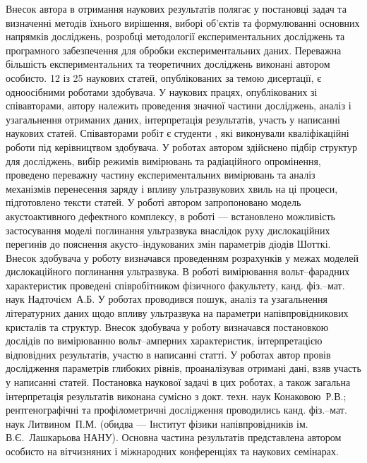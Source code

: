 {\contributionTXT}
Внесок автора в отримання наукових результатів полягає у постановці задач
та визначенні методів їхнього вирішення, виборі об'єктів та формулюванні
основних напрямків досліджень,
розробці методології експериментальних досліджень та програмного забезпечення для обробки експериментальних даних.
Переважна більшість експериментальних та теоретичних досліджень виконані автором особисто.
12 із 25 наукових статей, опублікованих за темою дисертації, є одноосібними роботами здобувача.
У наукових працях, опублікованих зі співавторами, автору належить проведення значної частини досліджень, аналіз і узагальнення отриманих
даних, інтерпретація результатів, участь у написанні наукових статей.
Співавторами робіт \cite{Olikh2018JAP,Olikh:Ultras2016,Olikh2016JSem,OlikhJAP,Olikh:PZTF2006} є студенти \thesisOfOrganization,
які виконували кваліфікаційні роботи під керівництвом здобувача.
У роботах \cite{Olikh2018JAP,Olikh:Ultras2016,Olikh2016JSem,OlikhJAP,Olikh:SEMT2007,Olikh:MRS2007a,Olikh:PZTF2006} автором здійснено підбір структур для досліджень, вибір режимів вимірювань та радіаційного опромінення,
проведено переважну частину експериментальних вимірювань та аналіз механізмів перенесення заряду і впливу ультразвукових хвиль на ці процеси,
підготовлено тексти статей.
У роботі \cite{Olikh2018JAP} автором запропоновано модель акустоактивного дефектного комплексу,
в роботі \cite{Olikh:Ultras2016} --- встановлено можливість застосування моделі поглинання ультразвука внаслідок руху дислокаційних перегинів до пояснення акусто--індукованих змін параметрів діодів Шотткі.
Внесок здобувача у роботу \cite{Olikh:UPJ2014} визначався проведенням розрахунків у межах моделей дислокаційного поглинання ультразвука.
В роботі \cite{Olikh:UPJ2013} вимірювання вольт--фарадних характеристик  проведені співробітником фізичного факультету, канд. фіз.--мат. наук Надточієм~А.\:Б.
У роботах \cite{Olikh:SEMT2004,Olikh:SEMT2011} проводився пошук, аналіз та узагальнення літературних даних щодо впливу ультразвука на параметри напівпровідникових кристалів та структур.
Внесок здобувача у роботу \cite{Gorb2010} визначався постановкою дослідів по вимірюванню вольт--амперних характеристик,
інтерпретацією відповідних результатів,
участю в написанні статті.
У роботах \cite{Olikh:PhChOM2005,Olikh:PJE2004} автор провів дослідження параметрів глибоких рівнів,
проаналізував отримані дані, взяв участь у написанні статей.
Постановка наукової задачі в цих роботах, а також загальна інтерпретація результатів виконана сумісно з докт. техн. наук Конаковою~Р.\:В.;
рентгенографічні та профілометричні дослідження проводились канд. фіз.--мат. наук Литвином~П.\:М.  (обидва --- Інститут фізики напівпровідників ім. В.\:Є.~Лашкарьова НАНУ).
Основна частина результатів
представлена автором особисто на вітчизняних і міжнародних конференціях
та наукових семінарах.







